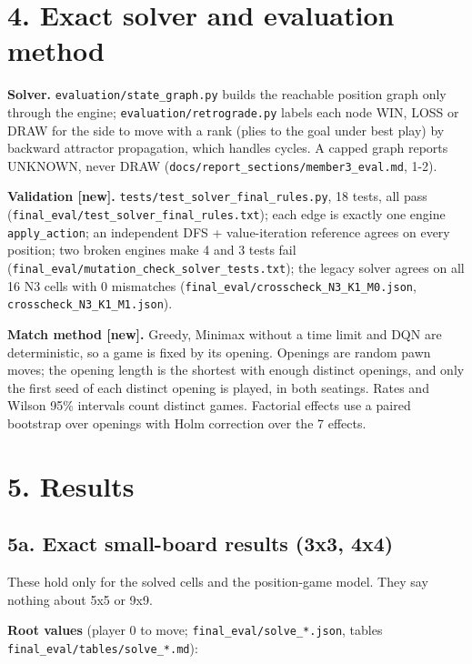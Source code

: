\documentclass[11pt]{article}
\begin{document}
\section{4. Exact solver and evaluation method}

\textbf{Solver.} \texttt{evaluation/state\_graph.py} builds the reachable position graph only through the
engine; \texttt{evaluation/retrograde.py} labels each node WIN, LOSS or DRAW for the side to move with
a rank (plies to the goal under best play) by backward attractor propagation, which handles
cycles. A capped graph reports UNKNOWN, never DRAW (\texttt{docs/report\_sections/member3\_eval.md}, 1-2).

\textbf{Validation [new].} \texttt{tests/test\_solver\_final\_rules.py}, 18 tests, all pass
(\texttt{final\_eval/test\_solver\_final\_rules.txt}); each edge is exactly one engine \texttt{apply\_action}; an
independent DFS + value-iteration reference agrees on every position; two broken engines make
4 and 3 tests fail (\texttt{final\_eval/mutation\_check\_solver\_tests.txt}); the legacy solver agrees on
all 16 N3 cells with 0 mismatches (\texttt{final\_eval/crosscheck\_N3\_K1\_M0.json}, \texttt{crosscheck\_N3\_K1\_M1.json}).

\textbf{Match method [new].} Greedy, Minimax without a time limit and DQN are deterministic, so a game
is fixed by its opening. Openings are random pawn moves; the opening length is the shortest with
enough distinct openings, and only the first seed of each distinct opening is played, in both
seatings. Rates and Wilson 95\% intervals count distinct games. Factorial effects use a paired
bootstrap over openings with Holm correction over the 7 effects.

\section{5. Results}

\subsection{5a. Exact small-board results (3x3, 4x4)}

These hold only for the solved cells and the position-game model. They say nothing about 5x5 or 9x9.

\textbf{Root values} (player 0 to move; \texttt{final\_eval/solve\_*.json}, tables \texttt{final\_eval/tables/solve\_*.md}):
\end{document}

